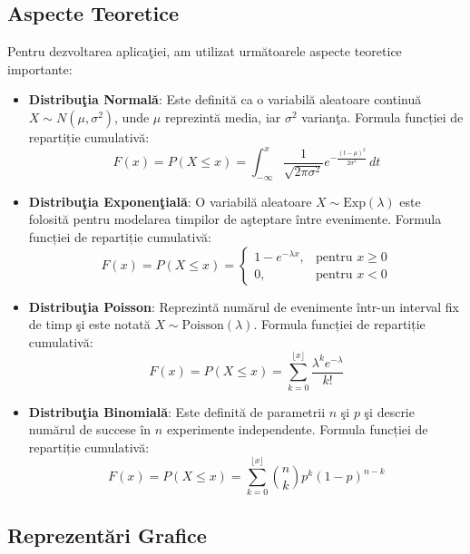 \documentclass[a4paper,11pt]{article}
\begin{document}
\subsection*{Aspecte Teoretice}
Pentru dezvoltarea aplica\c{t}iei, am utilizat urm\u{a}toarele aspecte teoretice importante:

\begin{itemize}
  \item \textbf{Distribu\c{t}ia Normal\u{a}}: Este definit\u{a} ca o variabil\u{a} aleatoare continu\u{a} $X \sim N(\mu, \sigma^2)$, unde $\mu$ reprezint\u{a} media, iar $\sigma^2$ varian\c{t}a.
  \newline
  Formula funcției de repartiție cumulativă:
  \[
  F(x) = P(X \leq x) = \int_{-\infty}^{x} \frac{1}{\sqrt{2\pi \sigma^2}} e^{-\frac{(t - \mu)^2}{2\sigma^2}} \, dt
  \]

  \item \textbf{Distribu\c{t}ia Exponen\c{t}ial\u{a}}: O variabil\u{a} aleatoare $X \sim \text{Exp}(\lambda)$ este folosit\u{a} pentru modelarea timpilor de a\c{s}teptare între evenimente.
  \newline
  Formula funcției de repartiție cumulativă:
  \[
  F(x) = P(X \leq x) = 
  \begin{cases}
  1 - e^{-\lambda x}, & \text{pentru } x \geq 0 \\
  0, & \text{pentru } x < 0
  \end{cases}
  \]

  \item \textbf{Distribu\c{t}ia Poisson}: Reprezint\u{a} num\u{a}rul de evenimente într-un interval fix de timp \c{s}i este notat\u{a} $X \sim \text{Poisson}(\lambda)$.
  \newline
  Formula funcției de repartiție cumulativă:
  \[
  F(x) = P(X \leq x) = \sum_{k=0}^{\lfloor x \rfloor} \frac{\lambda^k e^{-\lambda}}{k!}
  \]

  \item \textbf{Distribu\c{t}ia Binomial\u{a}}: Este definit\u{a} de parametrii $n$ \c{s}i $p$ \c{s}i descrie num\u{a}rul de succese în $n$ experimente independente.
  \newline
  Formula funcției de repartiție cumulativă:
  \[
  F(x) = P(X \leq x) = \sum_{k=0}^{\lfloor x \rfloor} \binom{n}{k} p^k (1 - p)^{n - k}
  \]
\end{itemize}

\newpage

\subsection*{Reprezent\u{a}ri Grafice}
\end{document}
